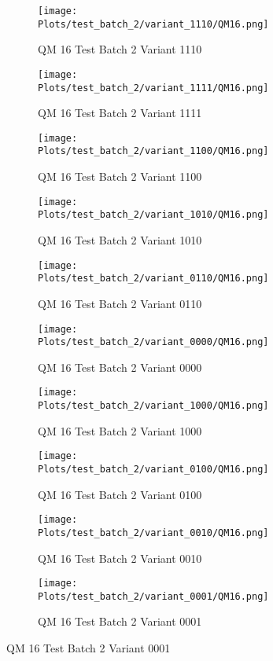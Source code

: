 \documentclass{DissertateFigs}
\begin{document}
\begin{figure}[t!]
    \begin{subfigure}{0.33\textwidth}
    \texttt{[image: Plots/test\_batch\_2/variant\_1110/QM16.png]}
    \caption{QM 16 Test Batch 2 Variant 1110}
    \end{subfigure}
    \begin{subfigure}{0.33\textwidth}
    \texttt{[image: Plots/test\_batch\_2/variant\_1111/QM16.png]}
    \caption{QM 16 Test Batch 2 Variant 1111}
    \end{subfigure}

\medskip

    \begin{subfigure}{0.33\textwidth}
    \texttt{[image: Plots/test\_batch\_2/variant\_1100/QM16.png]}
    \caption{QM 16 Test Batch 2 Variant 1100}
    \end{subfigure}
    \begin{subfigure}{0.33\textwidth}
    \texttt{[image: Plots/test\_batch\_2/variant\_1010/QM16.png]}
    \caption{QM 16 Test Batch 2 Variant 1010}
    \end{subfigure}

\medskip

    \begin{subfigure}{0.33\textwidth}
    \texttt{[image: Plots/test\_batch\_2/variant\_0110/QM16.png]}
    \caption{QM 16 Test Batch 2 Variant 0110}
    \end{subfigure}
    \begin{subfigure}{0.33\textwidth}
    \texttt{[image: Plots/test\_batch\_2/variant\_0000/QM16.png]}
    \caption{QM 16 Test Batch 2 Variant 0000}
    \end{subfigure}

\medskip

    \begin{subfigure}{0.33\textwidth}
    \texttt{[image: Plots/test\_batch\_2/variant\_1000/QM16.png]}
    \caption{QM 16 Test Batch 2 Variant 1000}
    \end{subfigure}
    \begin{subfigure}{0.33\textwidth}
    \texttt{[image: Plots/test\_batch\_2/variant\_0100/QM16.png]}
    \caption{QM 16 Test Batch 2 Variant 0100}
    \end{subfigure}

\medskip

    \begin{subfigure}{0.33\textwidth}
    \texttt{[image: Plots/test\_batch\_2/variant\_0010/QM16.png]}
    \caption{QM 16 Test Batch 2 Variant 0010}
    \end{subfigure}
    \begin{subfigure}{0.33\textwidth}
    \texttt{[image: Plots/test\_batch\_2/variant\_0001/QM16.png]}
    \caption{QM 16 Test Batch 2 Variant 0001}
    \end{subfigure}


\end{figure}
\end{document}
